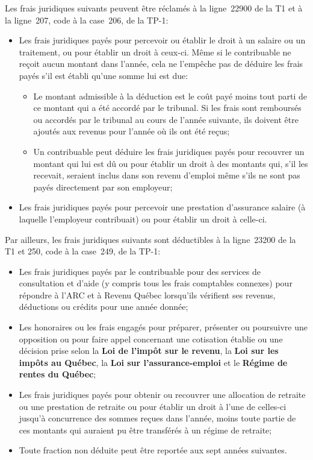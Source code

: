 Les frais juridiques suivants peuvent être réclamés à la ligne~22900 de la T1 et à la ligne~207, code  \fg{} à la case~206, de la TP-1:

\begin{itemize}
	\item Les frais juridiques payés pour percevoir ou établir le droit à un salaire ou un traitement, ou pour établir un droit à ceux-ci. Même si le contribuable ne reçoit aucun montant dans l'année, cela ne l'empêche pas de déduire les frais payés s'il est établi qu'une somme lui est due:
	\begin{itemize}
		\item Le montant admissible à la déduction est le coût payé moins tout parti de ce montant qui a été accordé par le tribunal. Si les frais sont remboursés ou accordés par le tribunal au cours de l'année suivante, ils doivent être ajoutés aux revenus pour l'année où ils ont été reçus;
		\item Un contribuable peut déduire les frais juridiques payés pour recouvrer un montant qui lui est dû ou pour établir un droit à des montants qui, s'il les recevait, seraient inclus dans son revenu d'emploi même s'ils ne sont pas payés directement par son employeur;
	\end{itemize}
	\item Les frais juridiques payés pour percevoir une prestation d'assurance salaire (à laquelle l'employeur contribuait) ou pour établir un droit à celle-ci.
\end{itemize}

Par ailleurs, les frais juridiques suivants sont déductibles à la ligne~23200 de la T1 et 250, code  \fg{} à la case~249, de la TP-1:

\begin{itemize}
	\item Les frais juridiques payés par le contribuable pour des services de consultation et d'aide (y compris tous les frais comptables connexes) pour répondre à l'ARC et à Revenu Québec lorsqu'ils vérifient ses revenus, déductions ou crédits pour une année donnée;
	\item Les honoraires ou les frais engagés pour préparer, présenter ou poursuivre une opposition ou pour faire appel concernant une cotisation établie ou une décision prise selon la \textbf{Loi de l'impôt sur le revenu}, la \textbf{Loi sur les impôts au Québec}, la \textbf{Loi sur l'assurance-emploi} et le \textbf{Régime de rentes du Québec};
	\item Les frais juridiques payés pour obtenir ou recouvrer une allocation de retraite ou une prestation de retraite ou pour établir un droit à l'une de celles-ci jusqu'à concurrence des sommes reçues dans l'année, moins toute partie de ces montants qui auraient pu être transférés à un régime de retraite;
	\item Toute fraction non déduite peut être reportée aux sept années suivantes.
\end{itemize}


